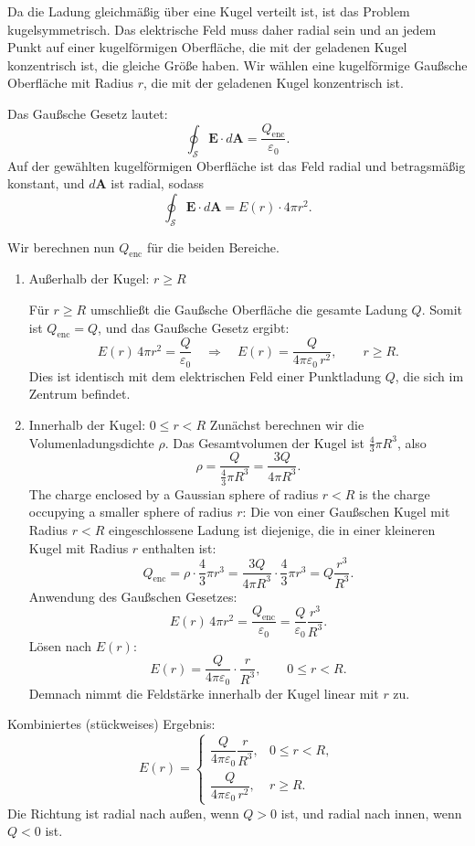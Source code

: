 \documentclass[11pt,a4paper]{article}
\newif\ifshowsolutions
\newenvironment{solution}
  {\ifshowsolutions
     \begin{tcolorbox}[enhanced, breakable, width=\textwidth,
       colback=green!5!white,colframe=green!50!black,
       fonttitle=\bfseries\large,
       title=Lösung]}
  {\end{tcolorbox}\fi}
\begin{document}
\ifshowsolutions
\begin{solution}
Da die Ladung gleichmäßig über eine Kugel verteilt ist, ist das Problem kugelsymmetrisch. Das elektrische Feld muss daher radial sein und an jedem Punkt auf einer kugelförmigen Oberfläche, die mit der geladenen Kugel konzentrisch ist, die gleiche Größe haben. Wir wählen eine kugelförmige Gaußsche Oberfläche mit Radius \(r\), die mit der geladenen Kugel konzentrisch ist.

Das Gaußsche Gesetz lautet:
\[
\oint_{\mathcal{S}} \mathbf{E}\cdot d\mathbf{A}=\frac{Q_{\mathrm{enc}}}{\varepsilon_0}.
\]
Auf der gewählten kugelförmigen Oberfläche ist das Feld radial und betragsmäßig konstant, und \(d\mathbf{A}\) ist radial, sodass
\[
\oint_{\mathcal{S}} \mathbf{E}\cdot d\mathbf{A}=E(r)\cdot 4\pi r^2.
\]

Wir berechnen nun \(Q_{\mathrm{enc}}\) für die beiden Bereiche.

\begin{enumerate}[label=\alph*)]
\item Außerhalb der Kugel: \(r\ge R\)

Für \(r\ge R\) umschließt die Gaußsche Oberfläche die gesamte Ladung \(Q\). Somit ist \(Q_{\mathrm{enc}}=Q\), und das Gaußsche Gesetz ergibt:
\[
E(r)\,4\pi r^2=\frac{Q}{\varepsilon_0}
\quad\Rightarrow\quad
E(r)=\frac{Q}{4\pi\varepsilon_0\,r^2},\qquad r\ge R.
\]
Dies ist identisch mit dem elektrischen Feld einer Punktladung \(Q\), die sich im Zentrum befindet.

\item Innerhalb der Kugel: \(0\le r< R\)
Zunächst berechnen wir die Volumenladungsdichte \(\rho\). Das Gesamtvolumen der Kugel ist \(\tfrac{4}{3}\pi R^3\), also
\[
\rho=\frac{Q}{\tfrac{4}{3}\pi R^3}=\frac{3Q}{4\pi R^3}.
\]
The charge enclosed by a Gaussian sphere of radius \(r<R\) is the charge occupying a smaller sphere of radius \(r\):
Die von einer Gaußschen Kugel mit Radius \(r<R\) eingeschlossene Ladung ist diejenige, die in einer kleineren Kugel mit Radius \(r\) enthalten ist:
\[
Q_{\mathrm{enc}}=\rho\cdot \frac{4}{3}\pi r^3
= \frac{3Q}{4\pi R^3}\cdot \frac{4}{3}\pi r^3
= Q\frac{r^3}{R^3}.
\]
Anwendung des Gaußschen Gesetzes:
\[
E(r)\,4\pi r^2=\frac{Q_{\mathrm{enc}}}{\varepsilon_0}
=\frac{Q}{\varepsilon_0}\frac{r^3}{R^3}.
\]
Lösen nach \(E(r)\):
\[
E(r)=\frac{Q}{4\pi\varepsilon_0}\cdot\frac{r}{R^3},\qquad 0\le r< R.
\]
Demnach nimmt die Feldstärke innerhalb der Kugel linear mit \(r\) zu.
\end{enumerate}

Kombiniertes (stückweises) Ergebnis:
\[
E(r)=
\begin{cases}
\dfrac{Q}{4\pi\varepsilon_0}\dfrac{r}{R^3}, & 0\le r< R,\\[8pt]
\dfrac{Q}{4\pi\varepsilon_0\,r^2}, & r\ge R.
\end{cases}
\]
Die Richtung ist radial nach außen, wenn \(Q>0\) ist, und radial nach innen, wenn \(Q<0\) ist.


\end{solution}
\end{document}
